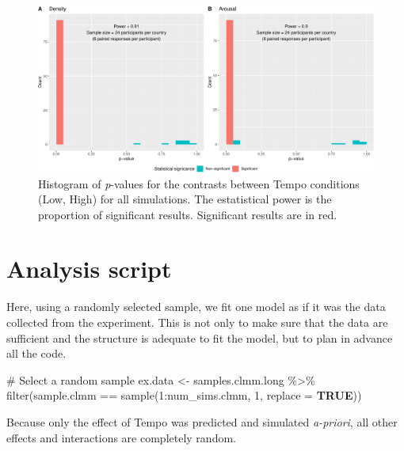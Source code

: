 \documentclass[
  bookmarksnumbered]{article}
\newenvironment{Shaded}{\begin{snugshade}}{\end{snugshade}}
\newcommand{\AttributeTok}[1]{\textcolor[rgb]{0.80,0.80,0.80}{#1}}
\newcommand{\CommentTok}[1]{\textcolor[rgb]{0.50,0.62,0.50}{#1}}
\newcommand{\ConstantTok}[1]{\textcolor[rgb]{0.86,0.64,0.64}{\textbf{#1}}}
\newcommand{\DecValTok}[1]{\textcolor[rgb]{0.86,0.86,0.80}{#1}}
\newcommand{\FunctionTok}[1]{\textcolor[rgb]{0.94,0.94,0.56}{#1}}
\newcommand{\NormalTok}[1]{\textcolor[rgb]{0.80,0.80,0.80}{#1}}
\newcommand{\OtherTok}[1]{\textcolor[rgb]{0.94,0.94,0.56}{#1}}
\newcommand{\SpecialCharTok}[1]{\textcolor[rgb]{0.86,0.64,0.64}{#1}}
\begin{document}
\begin{figure}
\centering
\includegraphics{Power_analysis_files/figure-latex/unnamed-chunk-11-1.pdf}
\caption{\label{fig:unnamed-chunk-11}Histogram of \emph{p}-values for the contrasts between Tempo conditions (Low, High) for all simulations. The estatistical power is the proportion of significant results. Significant results are in red.}
\end{figure}

\hypertarget{analysis-script}{%
\section{Analysis script}\label{analysis-script}}

Here, using a randomly selected sample, we fit one model as if it was the data collected from the experiment. This is not only to make sure that the data are sufficient and the structure is adequate to fit the model, but to plan in advance all the code.

\begin{Shaded}
\begin{Highlighting}[]
\CommentTok{\# Select a random sample}
\NormalTok{ex.data }\OtherTok{\textless{}{-}}\NormalTok{ samples.clmm.long }\SpecialCharTok{\%\textgreater{}\%}
  \FunctionTok{filter}\NormalTok{(sample.clmm }\SpecialCharTok{==} \FunctionTok{sample}\NormalTok{(}\DecValTok{1}\SpecialCharTok{:}\NormalTok{num\_sims.clmm, }\DecValTok{1}\NormalTok{, }\AttributeTok{replace =} \ConstantTok{TRUE}\NormalTok{))}
\end{Highlighting}
\end{Shaded}

Because only the effect of Tempo was predicted and simulated \emph{a-priori}, all other effects and interactions are completely random.
\end{document}
